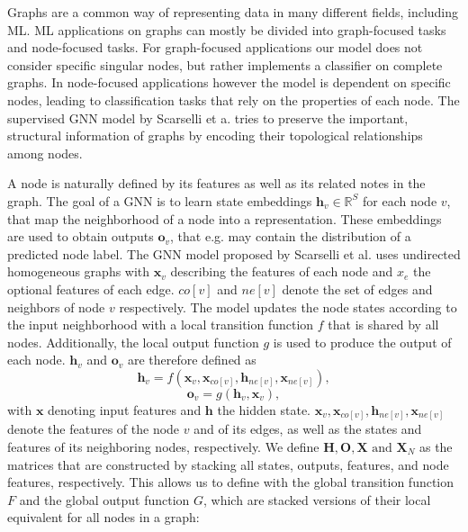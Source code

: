 Graphs are a common way of representing data in many different fields, including ML. ML applications on graphs can mostly be divided into graph-focused tasks and node-focused tasks. For graph-focused applications our model does not consider specific singular nodes, but rather implements a classifier on complete graphs. In node-focused applications however the model is dependent on specific nodes, leading to classification tasks that rely on the properties of each node.
The supervised GNN model by Scarselli et a.\cite{4700287} tries to preserve the important,  structural information of graphs by encoding their topological relationships among nodes.

A node is naturally defined by its features as well as its related notes in the graph. The goal of a GNN is to learn state embeddings $\mathbf{h}_v \in \mathbb{R}^S$ for each node $v$, that map the neighborhood of a node into a representation. These embeddings are used to obtain outputs $\mathbf{o}_v$, that e.g. may contain the distribution of a predicted node label. The GNN model proposed by Scarselli et al.\cite{4700287} uses undirected homogeneous graphs with $\mathbf{x}_v$ describing the features of each node and $x_e$ the optional features of each edge. $co[v]$ and $ne[v]$ denote the set of edges and neighbors of node $v$ respectively. The model updates the node states according to the input neighborhood with a local transition function $f$ that is shared by all nodes. Additionally, the local output function $g$ is used to produce the output of each node. $\mathbf{h}_v$ and $\mathbf{o}_v$ are therefore defined as
\begin{equation}
    \mathbf{h}_v = f(\mathbf{x}_v, \mathbf{x}_{co[v]}, \mathbf{h}_{ne[v]}, \mathbf{x}_{ne[v]}),
    \label{eq:gnn_state_local}
\end{equation}
\begin{equation}
    \mathbf{o}_v = g(\mathbf{h}_v, \mathbf{x}_v),
\end{equation}
with $\mathbf{x}$ denoting input features and $\mathbf{h}$ the hidden state. $\mathbf{x}_v, \mathbf{x}_{co[v]}, \mathbf{h}_{ne[v]}, \mathbf{x}_{ne[v]}$ denote the features of the node $v$ and of its edges, as well as the states and features of its neighboring nodes, respectively. We define $\mathbf{H}, \mathbf{O}, \mathbf{X} \text{ and  }\mathbf{X}_N$ as the matrices that are constructed by stacking all states, outputs, features, and node features, respectively. This allows us to define with the global transition function $F$ and the global output function $G$, which are stacked versions of their local equivalent for all nodes in a graph: 
